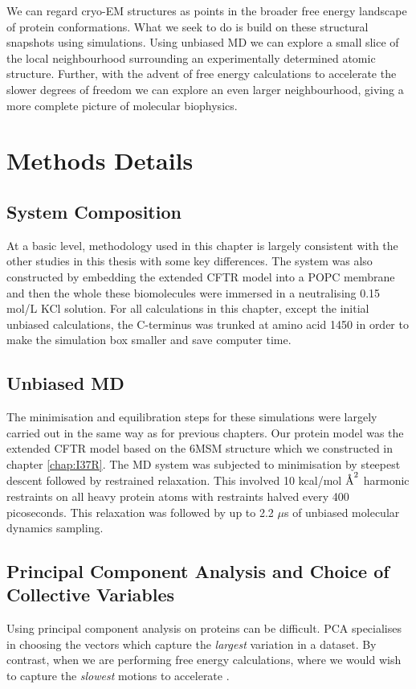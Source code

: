 We can regard cryo-EM structures as points in the broader free energy landscape of protein conformations. What we seek to do is build on these structural snapshots using simulations. Using unbiased MD we can explore a small slice of the local neighbourhood surrounding an experimentally determined atomic structure. Further, with the advent of free energy calculations to accelerate the slower degrees of freedom we can explore an even larger neighbourhood, giving a more complete picture of molecular biophysics. 

\section{Methods Details}
\subsection{System Composition}
At a basic level, methodology used in this chapter is largely consistent with the other studies in this thesis with some key differences. The system was also constructed by embedding the extended CFTR model into a POPC membrane and then the whole these biomolecules were immersed in a neutralising 0.15 mol/L KCl solution. For all calculations in this chapter, except the initial unbiased calculations, the C-terminus was trunked at amino acid 1450 in order to make the simulation box smaller and save computer time.

\subsection{Unbiased MD }
The minimisation and equilibration steps for these simulations were largely carried out in the same way as for previous chapters. Our protein model was the extended CFTR model based on the 6MSM structure \cite{zhang2018} which we constructed in chapter \ref{chap:I37R}. The MD system was subjected to minimisation by steepest descent followed by restrained relaxation. This involved 10 kcal/mol $\textup{\AA}^2$ harmonic restraints on all heavy protein atoms with restraints halved every 400 picoseconds. This relaxation was followed by up to 2.2 $\mu$s of unbiased molecular dynamics sampling.

\subsection {Principal Component Analysis and Choice of Collective Variables}
\label {supp_cv_choice}
Using principal component analysis on proteins can be difficult. PCA specialises in choosing the vectors which capture the \textit{largest} variation in a dataset. By contrast, when we are performing free energy calculations, where we would wish to capture the \textit{slowest} motions to accelerate \cite{noe2001}. 

